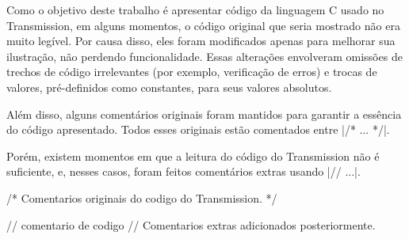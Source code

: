 Como o objetivo deste trabalho é apresentar código da linguagem C usado no Transmission,
em alguns momentos, o código original que seria mostrado não era muito legível. Por
causa disso, eles foram modificados apenas para melhorar sua ilustração, não perdendo
funcionalidade. Essas alterações envolveram omissões de trechos de código irrelevantes
(por exemplo, verificação de erros) e trocas de valores, pré-definidos como constantes,
para seus valores absolutos.

Além disso, alguns comentários originais foram mantidos para garantir a essência do
código apresentado. Todos esses originais estão comentados entre \sverb|/* ... */|.

Porém, existem momentos em que a leitura do código do Transmission não é suficiente, e,
nesses casos, foram feitos comentários extras usando \sverb|// ...|.

\begin{ccode}
    /* Comentarios originais do codigo do Transmission. */

    // comentario de codigo
    // Comentarios extras adicionados posteriormente.
\end{ccode}

\afterpage{\clearpage}